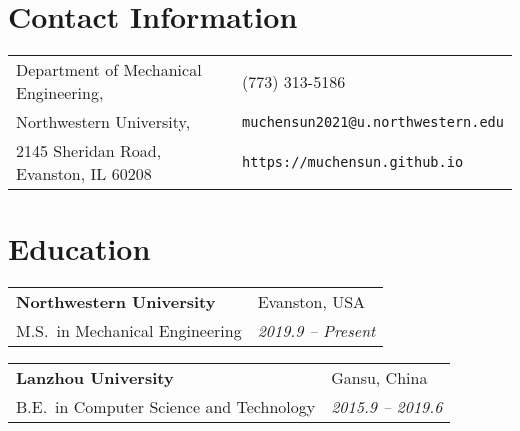 \documentclass[margin,line,pifont,palatino,courier]{res}
\newenvironment{list1}{
	\begin{list}{\ding{113}}{%
			\setlength{\itemsep}{0in}
			\setlength{\parsep}{0in} \setlength{\parskip}{0in}
			\setlength{\topsep}{0in} \setlength{\partopsep}{0in}
			\setlength{\leftmargin}{0.17in}}}{\end{list}}
\begin{document}
	
	
	\begin{resume}
		
		\section{\sc Contact Information}
		
		\begin{tabular}{@{}p{2.7in}p{2in}}
			Department of Mechanical Engineering, & (773) 313-5186 \\
			Northwestern University,  & \verb+muchensun2021@u.northwestern.edu+\\
			2145 Sheridan Road, Evanston, IL 60208 & \verb+https://muchensun.github.io+\\
		\end{tabular}
				
		\section{\sc Education}
		
		\begin{tabular}{@{}p{3.4in}p{2.0in}}
			{\bf Northwestern University} & {\sc Evanston, USA} \\
			M.S.~in Mechanical Engineering & {\sl 2019.9 -- Present} \\
		\end{tabular}
		
		\begin{tabular}{@{}p{3.4in}p{2.0in}}	
			{\bf Lanzhou University} & {\sc Gansu, China} \\
			B.E.~in Computer Science and Technology & {\sl 2015.9 -- 2019.6} \\
		\end{tabular}


\end{resume}
\end{document}
